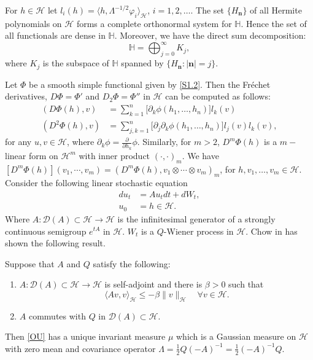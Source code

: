 \documentclass[review, onefignum, onetabnum]{siamart171218}
\begin{document}
\begin{lemma}\label{s1.le1}
        For $h\in\mathcal{H}  $ let $l_i(h)=\langle h,  \Lambda^{-1/2}\varphi_i
    \rangle_\mathcal{H}$, $ i=1,2,\ldots$. The set $\{H_{\bm{n}}\}$ of all
    Hermite polynomials on $\mathcal{H} $ forms a complete orthonormal system
    for $\mathbb{H} $. Hence the set of all functionals are dense in
    $\mathbb{H}$. Moreover, we have the direct sum decomposition:
    \[
        \mathbb{H} = \bigoplus_{j=0}^\infty K_j,
    \]
    where $K_j$ is the subspace of $\mathbb{H} $ spanned by $\{H_{\bm{n}}:
    |\bm{n}|=j\}$.
\end{lemma}
%
Let $\Phi$ be a smooth simple functional given by \eqref{S1.2}. Then the
Fr\'echet derivatives, $D \Phi = \Phi'$ and $D_2 \Phi = \Phi''$ in
$\mathcal{H}$ can be computed as follows:
\begin{equation}
    \label{s1.3}
    \begin{aligned}
        (D \Phi(h), v)
        &=
            \sum_{k=1}^n \big[\partial_k \phi(h_1,\ldots,h_n)\big]
            l_k(v)\nonumber
        \\
        (D^2 \Phi(h), v)
        &=
            \sum_{j,k=1}^n \big[\partial_j\partial_k
            \phi(h_1,\ldots,h_n)\big] l_j(v) l_k(v),
    \end{aligned}
\end{equation}
for any $u, v \in \mathcal{H}$, where
$\partial_k \phi= \frac{\partial}{\partial h_k} \phi$.
Similarly, for $m > 2$, $D^m \Phi(h)$ is a $m-$linear form on $\mathcal{H}^m$
with inner product $(\cdot,\cdot)_m$.
We have
$
    [D^m\Phi(h) ](v_1 , \cdots, v_m )
        = (D^m \Phi(h), v_1 \otimes \cdots \otimes v_m )_m
$,
for $h, v_1 , \ldots , v_m \in \mathcal{H}$.
Consider the following linear stochastic equation
\begin{align*}
    du_t&=Au_tdt+dW_t,\label{OU}\\
    u_0&=h\in \mathcal{H}.
\end{align*}
Where $A: \mathcal{D}(A) \subset \mathcal{H} \rightarrow \mathcal{H}$ is the
infinitesimal generator of a strongly continuous semigroup $e^{tA}$ in
$\mathcal{H}$. $W_t$ is a $Q$-Wiener process
in $\mathcal{H}$. Chow in \cite[Lemma 9.4.1]{liu} has shown the following
result.
\begin{lemma} \label{lemma-AQ}
    Suppose that $A$ and $Q$ satisfy the following:
    \begin{enumerate}
        \item
            $A:\mathcal{D}(A)\subset \mathcal{H}\rightarrow \mathcal{H}$ is
            self-adjoint and there is $\beta>0$ such that
            \[
                \langle Av,v\rangle_ \mathcal{H}\le -\beta\|v
                \|_\mathcal{H}\quad
                \forall v\in \mathcal{H}.
            \]
        \item $A$ commutes with $Q$ in $\mathcal{D}(A)\subset \mathcal{H}$.
    \end{enumerate}
    Then \eqref{OU} has a unique invariant measure $\mu$ which is a Gaussian
    measure on $ \mathcal{H}$ with zero mean and covariance
    operator
    $
        \Lambda=
            \tfrac{1}{2}Q(-A)^{-1}
            =\tfrac{1}{2}(-A)^{-1}Q
    $.
\end{lemma}
\end{document}
